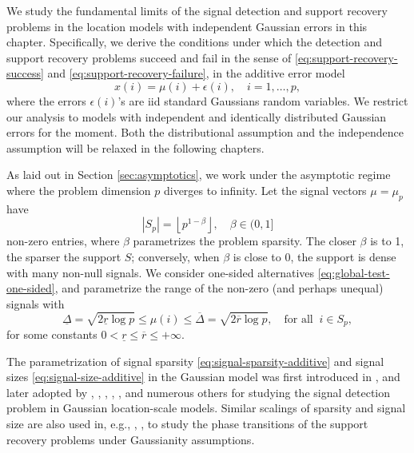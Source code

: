 
We study the fundamental limits of the signal detection and support recovery problems in the location models with independent Gaussian errors in this chapter.
Specifically, we derive the conditions under which the detection and support recovery problems succeed and fail in the sense of \eqref{eq:support-recovery-success} and \eqref{eq:support-recovery-failure}, in the additive error model 
\begin{equation} \label{eq:model-additive-Chapter3}
    x(i) = \mu(i) + \epsilon(i), \quad i=1,\ldots,p,
\end{equation}
where the errors $\epsilon(i)$'s are \ac{iid} standard Gaussians random variables.
We restrict our analysis to models with independent and identically distributed Gaussian errors for the moment.
Both the distributional assumption and the independence assumption will be relaxed in the following chapters.

As laid out in Section \ref{sec:asymptotics}, we work under the asymptotic regime where the problem dimension $p$ diverges to infinity.
Let the signal vectors $\mu = \mu_p$ have 
\begin{equation} \label{eq:signal-sparsity-additive}
    |S_p| = \left\lfloor p^{1-\beta} \right\rfloor, \quad \beta\in(0,1]
\end{equation}
non-zero entries, where $\beta$ parametrizes the problem sparsity.
The closer $\beta$ is to 1, the sparser the support $S$; conversely, when $\beta$ is close to 0, the support is dense with many non-null signals.
We consider one-sided alternatives \eqref{eq:global-test-one-sided}, and parametrize the range of the non-zero (and perhaps unequal) signals with
\begin{equation} \label{eq:signal-size-additive}
    \underline{\Delta} = \sqrt{2\underline{r}\log{p}}
    \le \mu(i) \le
    \overline{\Delta} = \sqrt{2\overline{r}\log{p}}, \quad \text{for all}\;\;i\in S_p,
\end{equation}
for some constants $0<\underline{r}\le\overline{r}\le+\infty$.

The parametrization of signal sparsity \eqref{eq:signal-sparsity-additive} and signal sizes \eqref{eq:signal-size-additive} in the Gaussian model was first introduced in \citet{ingster1998minimax}, and later adopted by \cite{hall2010innovated}, \cite{cai2011optimal}, \cite{zhong2013tests}, \cite{cai2014optimal}, \cite{arias2017distribution1}, and numerous others for studying the signal detection problem in Gaussian location-scale models.
Similar scalings of sparsity and signal size are also used in, e.g., \cite{ji2012ups}, \cite{jin2014optimality}, \cite{butucea2018variable} to study the phase transitions of the support recovery problems under Gaussianity assumptions.

